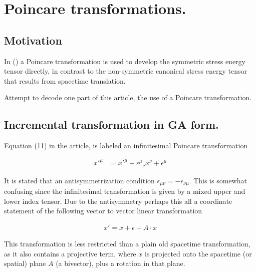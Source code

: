 

\chapter{Poincare transformations.}
\label{chap:poincareTx}
\date{ June 1, 2009.  $RCSfile: poincareTx.tex,v $ Last $Revision: 1.1 $ $Date: 2009/10/22 02:10:03 $ }

\beginArtWithToc

\section{Motivation}

In (\cite{montesinos2006sem}) a Poincare transformation is used to develop the symmetric stress energy tensor directly, in contrast to the non-symmetric canonical stress energy tensor that results from spacetime translation.

Attempt to decode one part of this article, the use of a Poincare transformation.

\section{Incremental transformation in GA form.}

Equation (11) in the article, is labeled an infinitesimal Poincare transformation

\begin{align}\label{eqn:txComponents}
{x'}^\mu
&=
{x'}^\mu
+ {{\epsilon}^\mu}_\nu x^\nu
+ {\epsilon}^\mu
\end{align}

It is stated that an antisymmetrization condition $\epsilon_{\mu\nu} = -\epsilon_{\nu\mu}$.  This is somewhat confusing since the infinitesimal transformation is given by a mixed upper and lower index tensor.   Due to the antisymmetry perhaps this all a coordinate statement of the following vector to vector linear transformation 

\begin{align}\label{eqn:linearTxGuess}
x' = x + \epsilon + A \cdot x
\end{align}

This transformation is less restricted than a plain old spacetime transformation, as it also contains a projective term, where $x$ is projected onto the spacetime (or spatial) plane $A$ (a bivector), plus a rotation in that plane.

